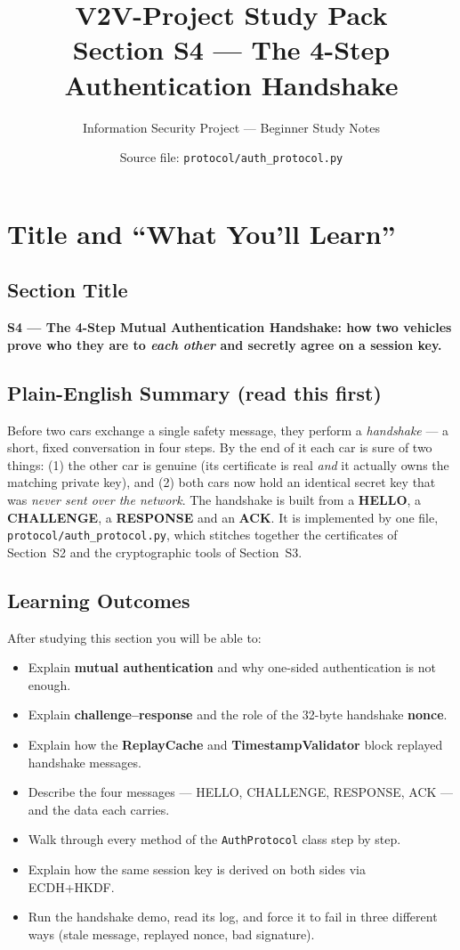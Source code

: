 \documentclass[11pt,a4paper]{article}
\title{\textbf{V2V-Project Study Pack}\\[4pt]
       \large Section S4 --- The 4-Step Authentication Handshake}
\author{Information Security Project --- Beginner Study Notes}
\date{Source file: \texttt{protocol/auth\_protocol.py}}
\begin{document}
\maketitle
\tableofcontents
\newpage

\section{Title and ``What You'll Learn''}

\subsection*{Section Title}
\textbf{S4 --- The 4-Step Mutual Authentication Handshake: how two vehicles
prove who they are to \emph{each other} and secretly agree on a session key.}

\subsection*{Plain-English Summary (read this first)}
Before two cars exchange a single safety message, they perform a
\emph{handshake} --- a short, fixed conversation in four steps. By the end of it
each car is sure of two things: (1) the other car is genuine (its certificate is
real \emph{and} it actually owns the matching private key), and (2) both cars now
hold an identical secret key that was \emph{never sent over the network}. The
handshake is built from a \textbf{HELLO}, a \textbf{CHALLENGE}, a
\textbf{RESPONSE} and an \textbf{ACK}. It is implemented by one file,
\texttt{protocol/auth\_protocol.py}, which stitches together the certificates of
Section~S2 and the cryptographic tools of Section~S3.

\subsection*{Learning Outcomes}
After studying this section you will be able to:
\begin{itemize}
  \item Explain \textbf{mutual authentication} and why one-sided authentication
        is not enough.
  \item Explain \textbf{challenge--response} and the role of the 32-byte
        handshake \textbf{nonce}.
  \item Explain how the \textbf{ReplayCache} and \textbf{TimestampValidator}
        block replayed handshake messages.
  \item Describe the four messages --- HELLO, CHALLENGE, RESPONSE, ACK --- and
        the data each carries.
  \item Walk through every method of the \texttt{AuthProtocol} class step by step.
  \item Explain how the same session key is derived on both sides via ECDH+HKDF.
  \item Run the handshake demo, read its log, and force it to fail in three
        different ways (stale message, replayed nonce, bad signature).
\end{itemize}
\end{document}

